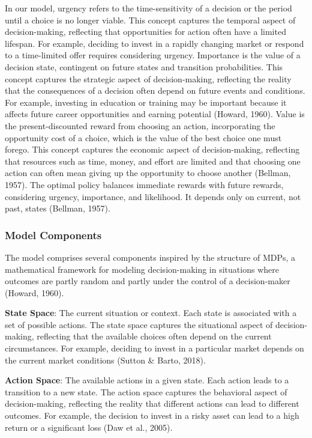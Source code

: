 \documentclass[
]{article}
\begin{document}
In our model, urgency refers to the time-sensitivity of a decision or
the period until a choice is no longer viable. This concept captures the
temporal aspect of decision-making, reflecting that opportunities for
action often have a limited lifespan. For example, deciding to invest in
a rapidly changing market or respond to a time-limited offer requires
considering urgency. Importance is the value of a decision state,
contingent on future states and transition probabilities. This concept
captures the strategic aspect of decision-making, reflecting the reality
that the consequences of a decision often depend on future events and
conditions. For example, investing in education or training may be
important because it affects future career opportunities and earning
potential (Howard, 1960). Value is the present-discounted reward from
choosing an action, incorporating the opportunity cost of a choice,
which is the value of the best choice one must forego. This concept
captures the economic aspect of decision-making, reflecting that
resources such as time, money, and effort are limited and that choosing
one action can often mean giving up the opportunity to choose another
(Bellman, 1957). The optimal policy balances immediate rewards with
future rewards, considering urgency, importance, and likelihood. It
depends only on current, not past, states (Bellman, 1957).

\hypertarget{model-components}{%
\subsubsection{Model Components}\label{model-components}}

The model comprises several components inspired by the structure of
MDPs, a mathematical framework for modeling decision-making in
situations where outcomes are partly random and partly under the control
of a decision-maker (Howard, 1960).

\textbf{State Space}: The current situation or context. Each state is
associated with a set of possible actions. The state space captures the
situational aspect of decision-making, reflecting that the available
choices often depend on the current circumstances. For example, deciding
to invest in a particular market depends on the current market
conditions (Sutton \& Barto, 2018).

\textbf{Action Space}: The available actions in a given state. Each
action leads to a transition to a new state. The action space captures
the behavioral aspect of decision-making, reflecting the reality that
different actions can lead to different outcomes. For example, the
decision to invest in a risky asset can lead to a high return or a
significant loss (Daw et al., 2005).
\end{document}
